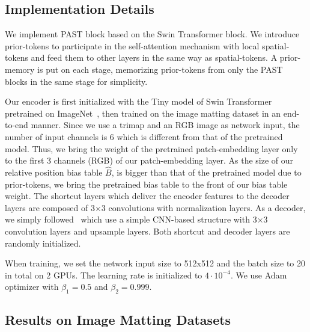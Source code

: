 \documentclass[10pt,twocolumn,letterpaper]{article}
\begin{document}
\subsection{Implementation Details}

We implement PAST block based on the Swin Transformer block. 
We introduce prior-tokens to participate in the self-attention mechanism with local spatial-tokens and feed them to other layers in the same way as spatial-tokens. A prior-memory is put on each stage, memorizing prior-tokens from only the PAST blocks in the same stage for simplicity.

Our encoder is first initialized with the Tiny model of Swin Transformer pretrained on ImageNet~\cite{deng2009imagenet}, then trained on the image matting dataset in an end-to-end manner.
Since we use a trimap and an RGB image as network input, the number of input channels is 6 which is different from that of the pretrained model.
Thus, we bring the weight of the pretrained patch-embedding layer only to the first 3 channels (RGB) of our patch-embedding layer.
As the size of our relative position bias table $\hat{B}$, is bigger than that of the pretrained model due to prior-tokens, we bring the pretrained bias table to the front of our bias table weight. 
The shortcut layers which deliver the encoder features to the decoder layers are composed of 3$\times$3 convolutions with normalization layers. As a decoder, we simply followed~\cite{yu2021mask} which use a simple CNN-based structure with 3$\times$3 convolution layers and upsample layers. Both shortcut and decoder layers are randomly initialized.

When training, we set the network input size to 512x512 and the batch size to 20 in total on 2 GPUs.
The learning rate is initialized to $4 \cdot 10^{-4}$. We use Adam optimizer with $\beta_{1}=0.5$ and $\beta_{2}= 0.999$.

\subsection{Results on Image Matting Datasets}
\end{document}
